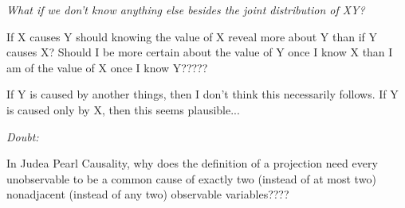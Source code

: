 \textit{What if we don't know anything else besides the joint distribution of XY?}

If X causes Y should knowing the value of X reveal more about Y than if Y causes X? Should I be more certain about the value of Y once I know X than I am of the value of X once I know Y?????

If Y is caused by another things, then I don't think this necessarily follows. If Y is caused only by X, then this seems plausible...

\textit{Doubt:}

In Judea Pearl Causality, why does the definition of a projection need every unobservable to be a common cause of exactly two (instead of at most two) nonadjacent (instead of any two) observable variables????

